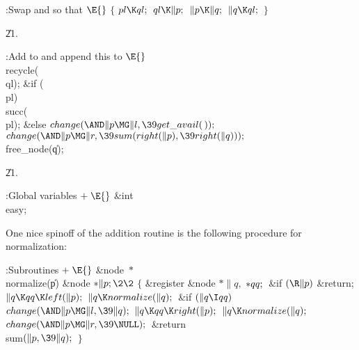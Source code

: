 \B{}:Swap  and  so that %
\X${}\E{}$\6
${}\{{}$\1\6
${}\\{pl}\K\\{ql};{}$\6
${}\\{ql}\K\|p;{}$\6
${}\|p\K\|q;{}$\6
${}\|q\K\\{ql};{}$\6
\4${}\}{}$\2\par
\U21.\fi

\B{}:Add  to  and
append this to \X${}\E{}$\6
\\{recycle}(\\{ql});\6
\&{if} (\\{pl})\1\5
\\{succ}(\\{pl});\2\6
\&{else}\1\5
${}\\{change}({\AND}\|p\MG\|l,\39\\{get\_avail}(\,));{}$\2\6
${}\\{change}({\AND}\|p\MG\|r,\39\\{sum}(\\{right}(\|p),\39\\{right}(\|q)));{}$%
\6
\\{free\_node}(\|q);\par
\U21.\fi

\B{}:Global variables\X${}\mathrel+\E{}$\6
\&{int} \\{easy};\par
\fi

One nice spinoff of the addition routine is the following
procedure
for normalization:

\Y\B\4:Subroutines\X${}\mathrel+\E{}$\6
\&{node} ${}{*}{}$\\{normalize}(\|p)\1\1\6
\&{node} ${}{*}\|p;\2\2{}$\6
${}\{{}$\1\6
\&{register} \&{node} ${}{*}\|q,{}$ ${}{*}\\{qq};{}$\7
\&{if} ${}(\R\|p){}$\1\5
\&{return};\2\6
${}\|q\K\\{qq}\K\\{left}(\|p);{}$\6
${}\|q\K\\{normalize}(\|q);{}$\6
\&{if} ${}(\|q\I\\{qq}){}$\1\5
${}\\{change}({\AND}\|p\MG\|l,\39\|q);{}$\2\6
${}\|q\K\\{qq}\K\\{right}(\|p);{}$\6
${}\|q\K\\{normalize}(\|q);{}$\6
${}\\{change}({\AND}\|p\MG\|r,\39\NULL);{}$\6
\&{return} \\{sum}${}(\|p,\39\|q);{}$\6
\4${}\}{}$\2\par
\fi

